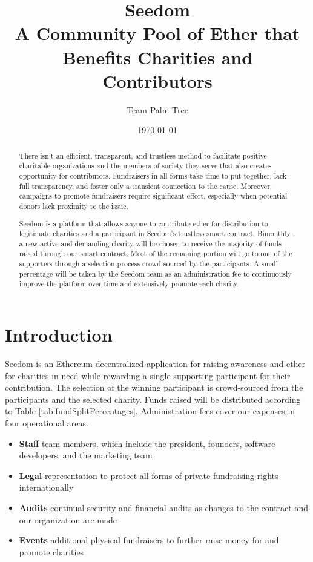 \documentclass[11pt]{article}
\begin{document}
\title{%
\Huge Seedom \\[4mm]
\large A Community Pool of Ether that Benefits Charities and Contributors \\[1mm]}
\author{Team Palm Tree}
\date{\today}
\maketitle

\begin{abstract}

There isn't an efficient, transparent, and trustless method to facilitate positive charitable organizations and the members of society they serve that also creates opportunity for contributors. Fundraisers in all forms take time to put together, lack full transparency, and foster only a transient connection to the cause. Moreover, campaigns to promote fundraisers require significant effort, especially when potential donors lack proximity to the issue.

Seedom is a platform that allows anyone to contribute ether for distribution to legitimate charities and a participant in Seedom's trustless smart contract. Bimonthly, a new active and demanding charity will be chosen to receive the majority of funds raised through our smart contract. Most of the remaining portion will go to one of the supporters through a selection process crowd-sourced by the participants. A small percentage will be taken by the Seedom team as an administration fee to continuously improve the platform over time and extensively promote each charity.

\end{abstract}
\pagebreak

\tableofcontents
\pagebreak

\section{Introduction}

Seedom is an Ethereum decentralized application for raising awareness and ether for charities in need while rewarding a single supporting participant for their contribution. The selection of the winning participant is crowd-sourced from the participants and the selected charity. Funds raised will be distributed according to Table \ref{tab:fundSplitPercentages}. Administration fees cover our expenses in four operational areas.

\begin{itemize}
\item{\textbf{Staff} team members, which include the president, founders, software developers, and the marketing team}
\item{\textbf{Legal} representation to protect all forms of private fundraising rights internationally}
\item{\textbf{Audits} continual security and financial audits as changes to the contract and our organization are made}
\item{\textbf{Events} additional physical fundraisers to further raise money for and promote charities}
\end{itemize}
\end{document}
